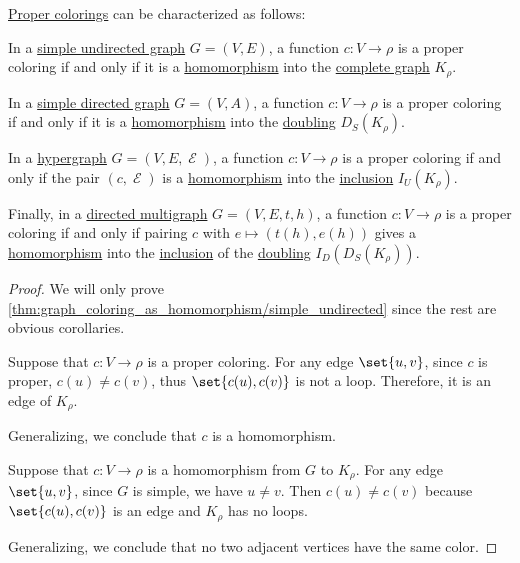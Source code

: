 \begin{proposition}\label{thm:graph_coloring_as_homomorphism}
  \hyperref[def:graph_coloring/proper]{Proper colorings} can be characterized as follows:

  \begin{thmenum}
     In a \hyperref[def:undirected_graph]{simple undirected graph} \( G = (V, E) \), a function \( c: V \to \rho \) is a proper coloring if and only if it is a \hyperref[def:undirected_graph/morphism]{homomorphism} into the \hyperref[def:complete_graph]{complete graph} \( K_\rho \).

     In a \hyperref[def:directed_graph]{simple directed graph} \( G = (V, A) \), a function \( c: V \to \rho \) is a proper coloring if and only if it is a \hyperref[def:directed_graph/morphism]{homomorphism} into the \hyperref[def:graph_functors/simple_doubling]{doubling} \( D_S(K_\rho) \).

     In a \hyperref[def:hypergraph]{hypergraph} \( G = (V, E, \mscrE) \), a function \( c: V \to \rho \) is a proper coloring if and only if the pair \( (c, \mscrE) \) is a \hyperref[def:hypergraph/morphism]{homomorphism} into the \hyperref[def:graph_functors/undirected_inclusion]{inclusion} \( I_U(K_\rho) \).

     Finally, in a \hyperref[def:directed_multigraph]{directed multigraph} \( G = (V, E, t, h) \), a function \( c: V \to \rho \) is a proper coloring if and only if pairing \( c \) with \( e \mapsto (t(h), e(h)) \) gives a \hyperref[def:directed_multigraph/morphism]{homomorphism} into the \hyperref[def:graph_functors/directed_inclusion]{inclusion} of the \hyperref[def:graph_functors/simple_doubling]{doubling} \( I_D(D_S(K_\rho)) \).
  \end{thmenum}
\end{proposition}
\begin{proof}
  We will only prove \cref{thm:graph_coloring_as_homomorphism/simple_undirected} since the rest are obvious corollaries.

  \SufficiencySubProof Suppose that \( c: V \to \rho \) is a proper coloring. For any edge \( \set{ u, v } \), since \( c \) is proper, \( c(u) \neq c(v) \), thus \( \set{ c(u), c(v) } \) is not a loop. Therefore, it is an edge of \( K_\rho \).

  Generalizing, we conclude that \( c \) is a homomorphism.

  \NecessitySubProof Suppose that \( c: V \to \rho \) is a homomorphism from \( G \) to \( K_\rho \). For any edge \( \set{ u, v } \), since \( G \) is simple, we have \( u \neq v \). Then \( c(u) \neq c(v) \) because \( \set{ c(u), c(v) } \) is an edge and \( K_\rho \) has no loops.

  Generalizing, we conclude that no two adjacent vertices have the same color.
\end{proof}

